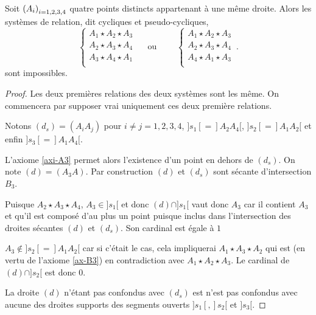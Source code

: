 \begin{lem}\label{lem-Impossibilitecyclique}
    Soit $\left(A_{i}\right)_{i = 1,2,3,4}$ quatre points distincts appartenant à une même droite. Alors les systèmes de relation, dit cycliques et pseudo-cycliques,
        \begin{equation*}
        \left\{
            \begin{array}{c}
                 A_{1} \star A_{2} \star A_{3} \\
                 A_{2} \star A_{3} \star A_{4}\\
                 A_{3} \star A_{4} \star A_{1}\\
            \end{array}
            \right. 
             \quad\text{ ou }\qquad \left\{
            \begin{array}{c}
                 A_{1} \star A_{2} \star A_{3} \\
                 A_{2} \star A_{3} \star A_{4}\\
                 A_{4} \star A_{1} \star A_{3}\\
            \end{array}
            \right.
            \,.
    \end{equation*}
    sont impossibles. 
    \begin{proof}
        Les deux premières relations des deux systèmes sont les même. On commencera par supposer vrai uniquement ces deux première relations.
    
        Notons $(d_s)=(A_i A_j)$ pour $i\neq j = 1,2,3,4$, $]s_1[=]A_2 A_4[$, $]s_2[=]A_1 A_2[$ et enfin $]s_3[=]A_1 A_4[$. 

        L'axiome \ref{axi-A3} permet alors l'existence d'un point en dehors de $(d_s)$. On note $(d)=(A_3 A)$.  Par construction $(d)$ et $(d_s)$ sont sécante d'intersection $B_3$.

        Puisque $A_{2} \star A_{3} \star A_{4}$, $A_3\in ]s_1[$ et donc $(d)\cap ]s_1[$ vaut donc $A_3$ car il contient $A_3$ et qu'il est composé d'au plus un point puisque inclus dans l'intersection des droites sécantes $(d)$ et $(d_s)$. Son cardinal est égale à $1$

        $A_3 \notin ]s_2[ = ]A_1 A_2[$ car si c'était le cas, cela impliquerai $A_1 \star A_3 \star A_2$ qui est (en vertu de l'axiome \ref{ax-B3}) en contradiction avec $A_{1} \star A_{2} \star A_{3}$. Le cardinal de $(d)\cap]s_2[$ est donc $0$.

        La droite $(d)$ n'étant pas confondus avec $(d_s)$ est n'est pas confondus avec aucune des droites supports des segments ouverts $]s_1[,]s_2[$ et $]s_3[$. 


\end{proof}
\end{lem}
